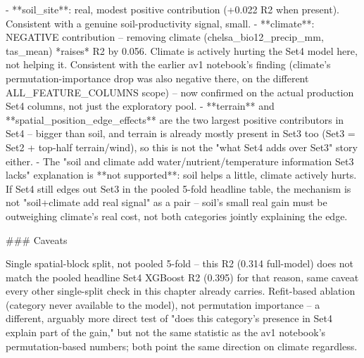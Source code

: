 - **soil_site**: real, modest positive contribution (+0.022 R2 when present). Consistent with a
  genuine soil-productivity signal, small.
- **climate**: NEGATIVE contribution -- removing climate (chelsa_bio12_precip_mm, tas_mean)
  *raises* R2 by 0.056. Climate is actively hurting the Set4 model here, not helping it.
  Consistent with the earlier av1 notebook's finding (climate's permutation-importance drop was
  also negative there, on the different ALL_FEATURE_COLUMNS scope) -- now confirmed on the
  actual production Set4 columns, not just the exploratory pool.
- **terrain** and **spatial_position_edge_effects** are the two largest positive contributors in
  Set4 -- bigger than soil, and terrain is already mostly present in Set3 too (Set3 = Set2 +
  top-half terrain/wind), so this is not the "what Set4 adds over Set3" story either.
- The "soil and climate add water/nutrient/temperature information Set3 lacks" explanation is
  **not supported**: soil helps a little, climate actively hurts. If Set4 still edges out Set3
  in the pooled 5-fold headline table, the mechanism is not "soil+climate add real signal" as a
  pair -- soil's small real gain must be outweighing climate's real cost, not both categories
  jointly explaining the edge.

### Caveats

Single spatial-block split, not pooled 5-fold -- this R2 (0.314 full-model) does not match the
pooled headline Set4 XGBoost R2 (0.395) for that reason, same caveat every other single-split
check in this chapter already carries. Refit-based ablation (category never available to the
model), not permutation importance -- a different, arguably more direct test of "does this
category's presence in Set4 explain part of the gain," but not the same statistic as the av1
notebook's permutation-based numbers; both point the same direction on climate regardless.
